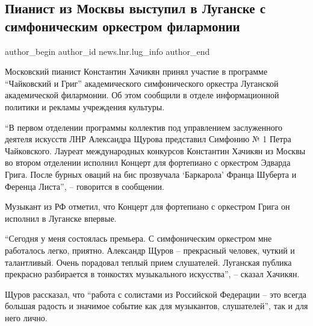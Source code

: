  
 
 
 
 
 
\subsection{Пианист из Москвы выступил в Луганске с симфоническим оркестром филармонии}
\label{sec:22_01_2022.stz.news.lnr.lug_info.1.koncert_muzykant_iz_moskvy_filarmonia}
 
\ifcmt
 author_begin
   author_id news.lnr.lug_info
 author_end
\fi

Московский пианист Константин Хачикян принял участие в программе \enquote{Чайковский и
Григ} академического симфонического оркестра Луганской академической
филармонии. Об этом сообщили в отделе информационной политики и рекламы
учреждения культуры.

\enquote{В первом отделении программы коллектив под управлением заслуженного деятеля
искусств ЛНР Александра Щурова представил Симфонию № 1 Петра Чайковского.
Лауреат международных конкурсов Константин Хачикян из Москвы во втором
отделении исполнил Концерт для фортепиано с оркестром Эдварда Грига. После
бурных оваций на бис прозвучала \enquote{Баркарола} Франца Шуберта и Ференца Листа}, –
говорится в сообщении.

Музыкант из РФ отметил, что Концерт для фортепиано с оркестром Грига он
исполнил в Луганске впервые.

\enquote{Сегодня у меня состоялась премьера. С симфоническим оркестром мне работалось
легко, приятно. Александр Щуров – прекрасный человек, чуткий и талантливый.
Очень порадовал теплый прием слушателей. Луганская публика прекрасно
разбирается в тонкостях музыкального искусства}, – сказал Хачикян.

Щуров рассказал, что \enquote{работа с солистами из Российской Федерации – это всегда
большая радость и значимое событие как для музыкантов, слушателей}, так и для
него лично.

